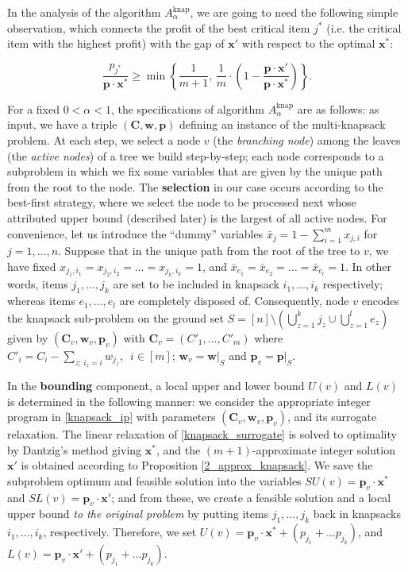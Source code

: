 \documentclass[a4paper,UKenglish,cleveref, autoref, thm-restate, pdfa]{lipics-v2021}
\theoremstyle{plain}
\begin{document}
In the analysis of the algorithm $A^{\text{knap}}_{\alpha}$, we are going to need the following simple observation, which connects the profit of the best critical item $j^*$ (i.e. the critical item with the highest profit) with the gap of $\bm{x}'$ with respect to the optimal $\bm{x}^*$:

\begin{lmm}\label{knapsack_gap_and_critical_element}
     \[
     \frac{p_{j^*}}{\bm{p}\cdot \bm{x}^*} \ge \min\left\{\frac{1}{m+1}, \,\frac{1}{m} \cdot \left(1-\frac{\bm{p}\cdot \bm{x}'}{\bm{p}\cdot \bm{x}^*}\right)\right\}.
    \]
\end{lmm}

For a fixed $0 <\alpha < 1$,  the specifications of algorithm $A^{\text{knap}}_{\alpha}$ are as follows: as input, we have a triple $(\bm{C}, \bm{w}, \bm{p})$ defining an instance of the multi-knapsack problem. At each step, we select a node $v$ (the \emph{branching node}) among the leaves (the \emph{active nodes}) of a tree we build step-by-step; each node corresponds to a subproblem in which we fix some variables that are given by the unique path from the root to the node. The \textbf{selection} in our case occurs according to the best-first strategy, where we select the node to be processed next whose attributed upper bound (described later) is the largest of all active nodes. For convenience, let us introduce the ``dummy'' variables $\bar{x}_j = 1-\sum\limits_{i=1}^m x_{j,i}$ for $j = 1, \ldots, n$. Suppose that in the unique path from the root of the tree to $v$, we have fixed $x_{j_1, i_1} = x_{j_2, i_2} = \ldots = x_{j_k, i_k} = 1$, and $\bar{x}_{e_1} = \bar{x}_{e_2} = \ldots = \bar{x}_{e_l}=1$. In other words, items $j_1, \ldots, j_k$ are set to be included in knapsack $i_1, \ldots, i_k$ respectively; whereas items $e_1, \ldots, e_l$ are completely disposed of. Consequently, node $v$ encodes the knapsack sub-problem on the ground set $S=[n]\setminus \left(\bigcup_{z=1}^k j_z \cup \bigcup_{z=1}^l e_z\right)$ given by $(\bm{C}_v, \bm{w}_v, \bm{p}_v)$ with $\bm{C}_v = (C'_1, \ldots, C'_m)$ where $C'_i = C_i-\sum\limits_{z:\, i_z = i} w_{j_z}, \,\,\, i \in [m]$; $\bm{w}_v=\bm{w}|_{S}$ and $\bm{p}_v=\bm{p}|_{S}$. 

In the \textbf{bounding} component, a local upper and lower bound $U(v)$ and $L(v)$ is determined in the following manner: we consider the appropriate integer program in \eqref{knapsack_ip} with parameters $(\bm{C}_v, \bm{w}_v, \bm{p}_v)$, and its surrogate relaxation. The linear relaxation of \eqref{knapsack_surrogate} is solved to optimality by Dantzig's method giving $\bm{x}^*$, and the $(m+1)$-approximate integer solution $\bm{x}'$ is obtained according to Proposition \ref{2_approx_knapsack}. We save the subproblem optimum and feasible solution into the variables $SU(v)=\bm{p}_v\cdot \bm{x}^*$ and $SL(v)=\bm{p}_v\cdot \bm{x}'$; and from these, we create a feasible solution and a local upper bound \emph{to the original problem} by putting items $j_1, \ldots, j_k$ back in knapsacks $i_1, \ldots, i_k$, respectively. Therefore, we set $U(v) = \bm{p}_v\cdot \bm{x}^* + (p_{j_1}+\ldots p_{j_k})$, and $L(v)= \bm{p}_v\cdot \bm{x}' + (p_{j_1}+\ldots p_{j_k})$.
\end{document}
